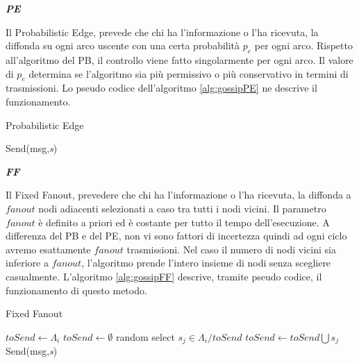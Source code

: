 \noindent\textbf{\textit{\acf{PE}}}

Il Probabilistic Edge, prevede che chi ha l'informazione o l'ha ricevuta, la diffonda su ogni arco uscente con una certa probabilità $\mathit{p_e}$ per ogni arco. Rispetto all'algoritmo del \acs{PB}, il controllo viene fatto singolarmente per ogni arco. Il valore di $\mathit{p_e}$ determina se l'algoritmo sia più permissivo o più conservativo in termini di trasmissioni. Lo pseudo codice dell'algoritmo \ref{alg:gossipPE} ne descrive il funzionamento.
\bigskip
\begin{algorithm}[h]
	\caption{Probabilistic Edge}\label{alg:gossipPE}
	\begin{algorithmic}[1]
					\State Send(msg,\emph{s})
				\EndIf
			\EndFor
		\EndFunction
	\end{algorithmic}
\end{algorithm}
\bigskip

\noindent\textbf{\textit{\acf{FF}}}

Il Fixed Fanout, prevedere che chi ha l'informazione o l'ha ricevuta, la diffonda a $\mathit{fanout}$ nodi adiacenti selezionati a caso tra tutti i nodi vicini. Il parametro $\mathit{fanout}$ è definito a priori ed è costante per tutto il tempo dell'esecuzione. A differenza del \acs{PB} e del \acs{PE}, non vi sono fattori di incertezza quindi ad ogni ciclo avremo esattamente $\mathit{fanout}$ trasmissioni. Nel caso il numero di nodi vicini sia inferiore a $\mathit{fanout}$, l'algoritmo prende l'intero insieme di nodi senza scegliere casualmente. L'algoritmo \ref{alg:gossipFF} descrive, tramite pseudo codice, il funzionamento di questo metodo.
\bigskip
\begin{algorithm}[h]
	\caption{Fixed Fanout}\label{alg:gossipFF}
	\begin{algorithmic}[1]
				\State $ \textit{toSend} \gets \Lambda_i $
			\Else
				\State $ \textit{toSend} \gets \emptyset $
					\State random select $ \textit{s}_\textit{j} \in \Lambda_{i}/\textit{toSend} $
					\State $ \textit{toSend} \gets \textit{toSend}\bigcup \textit{s}_\textit{j}$
				\EndFor
			\EndIf
				\State Send(msg,\emph{s})
			\EndFor
		\EndFunction
	\end{algorithmic}
\end{algorithm}
\bigskip

